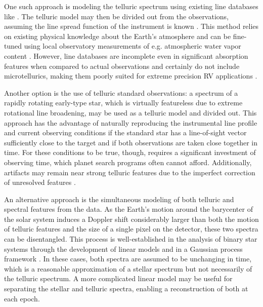 \documentclass[modern]{aastex62}
\begin{document}
One such approach is modeling the telluric spectrum using existing line databases like  \citep{HITRAN2016}. 
The telluric model may then be divided out from the observations, assuming the line spread function of the instrument is known \citep[e.g.][]{Seifahrt2010}. 
This method relies on existing physical knowledge about the Earth's atmosphere and can be fine-tuned using local observatory measurements of e.g. atmospheric water vapor content \citep{Baker2017}. 
However, line databases are incomplete even in significant absorption features when compared to actual observations and certainly do not include microtellurics, making them poorly suited for extreme precision RV applications \citep{Bertaux2014}.

Another option is the use of telluric standard observations: a spectrum of a rapidly rotating early-type star, which is virtually featureless due to extreme rotational line broadening, may be used as a telluric model and divided out. 
This approach has the advantage of naturally reproducing the instrumental line profile and current observing conditions if the standard star has a line-of-sight vector sufficiently close to the target and if both observations are taken close together in time. 
For these conditions to be true, though, requires a significant investment of observing time, which planet search programs often cannot afford. 
Additionally, artifacts may remain near strong telluric features due to the imperfect correction of unresolved features \citep{Bailey2007}.

An alternative approach is the simultaneous modeling of both telluric and spectral features from the data. 
As the Earth's motion around the barycenter of the solar system induces a Doppler shift considerably larger than both the motion of telluric features and the size of a single pixel on the detector, these two spectra can be disentangled.
This process is well-established in the analysis of binary star systems through the development of linear models \citep[e.g.][]{Simon1994} and in a Gaussian process framework \citep{Czekala2017}.
In these cases, both spectra are assumed to be unchanging in time, which is a reasonable approximation of a stellar spectrum but not necessarily of the telluric spectrum.
A more complicated linear model may be useful for separating the stellar and telluric spectra, enabling a reconstruction of both at each epoch.

\end{document}
